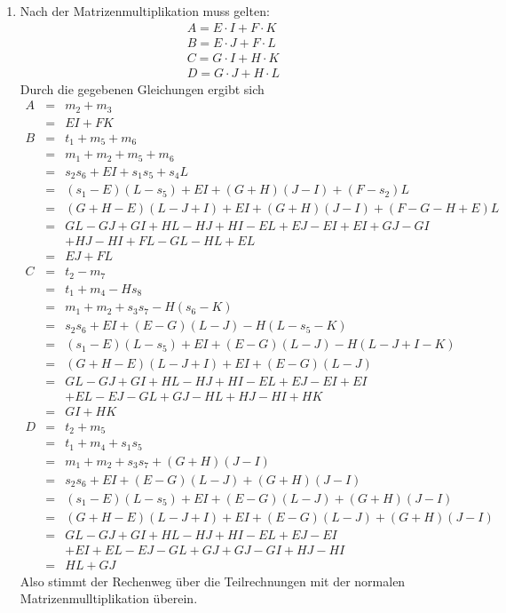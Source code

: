 \documentclass[a4paper,11pt]{article}             %
\begin{document}

\begin{enumerate}
\item
Nach der Matrizenmultiplikation muss gelten:
\begin{equation*}
\begin{array}{c}
A = E \cdot I + F \cdot K\\
B = E \cdot J + F \cdot L\\
C = G \cdot I + H \cdot K\\
D = G \cdot J + H \cdot L
\end{array}
\end{equation*}
Durch die gegebenen Gleichungen ergibt sich
\begin{equation*}
\begin{array}{rcl}
A & = & m_2 + m_3\\
~ & = & E I + F K\\
B & = & t_1 + m_5 + m_6\\
~ & = & m_1 + m_2 + m_5 + m_6\\
~ & = & s_2 s_6 + E I + s_1 s_5 + s_4 L\\
~ & = & (s_1 - E) (L - s_5) + E I + (G + H) (J - I) + (F - s_2) L\\
~ & = & (G + H - E) (L - J + I) + E I + (G + H) (J - I) + (F - G - H + E) L\\
~ & = & GL - GJ + GI + HL - HJ + HI - EL + EJ - EI + EI + GJ - GI\\
~ & ~ & + HJ - HI + FL - GL - HL + EL\\
~ & = & EJ + FL\\
C & = & t_2 - m_7\\
~ & = & t_1 + m_4 - H s_8\\
~ & = & m_1 + m_2 + s_3 s_7 - H (s_6 - K)\\
~ & = & s_2 s_6 + EI + (E - G) (L - J) - H (L - s_5 - K)\\
~ & = & (s_1 - E) (L - s_5) + EI + (E-G) (L-J) - H (L - J + I - K)\\
~ & = & (G+H-E)(L-J+I) + EI + (E-G)(L-J)\\
~ & = & GL-GJ+GI+HL-HJ+HI-EL+EJ-EI+EI\\
~ & ~ & +EL-EJ-GL+GJ-HL+HJ-HI+HK\\
~ & = & GI+HK\\
D & = & t_2 + m_5\\
~ & = & t_1 + m_4 + s_1 s_5\\
~ & = & m_1 + m_2 + s_3 s_7 + (G+H) (J-I)\\
~ & = & s_2 s_6 + EI + (E-G) (L-J) + (G+H) (J-I)\\
~ & = & (s_1-E) (L-s_5) + EI + (E-G) (L-J) + (G+H) (J-I)\\
~ & = & (G+H-E) (L-J+I) + EI + (E-G) (L-J) + (G+H) (J-I)\\
~ & = & GL-GJ+GI+HL-HJ+HI-EL+EJ-EI\\
~ & ~ & +EI+EL-EJ-GL+GJ+GJ-GI+HJ-HI\\
~ & = & HL+GJ
\end{array}
\end{equation*}
Also stimmt der Rechenweg über die Teilrechnungen mit der normalen Matrizenmulltiplikation überein.


\end{enumerate}
\end{document}
